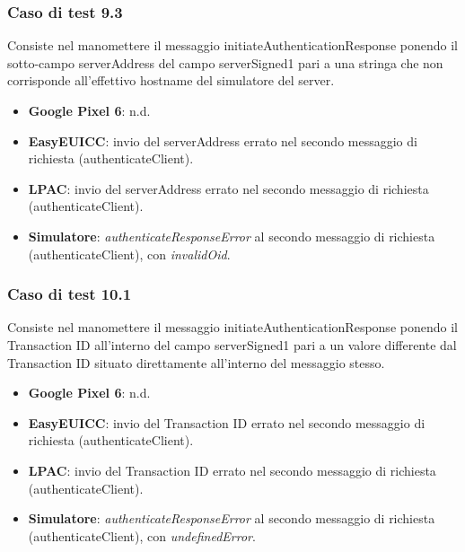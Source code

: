 \documentclass[10pt, oneside]{book}
\begin{document}
\subsubsection{Caso di test 9.3}
Consiste nel manomettere il messaggio initiateAuthenticationResponse ponendo il sotto-campo serverAddress del campo serverSigned1 pari a una stringa che non corrisponde all’effettivo hostname del simulatore del server.
\begin{itemize}
\item \textbf{Google Pixel 6}: n.d.
\item \textbf{EasyEUICC}: invio del serverAddress errato nel secondo messaggio di richiesta (authenticateClient).
\item \textbf{LPAC}: invio del serverAddress errato nel secondo messaggio di richiesta (authenticateClient).
\item \textbf{Simulatore}: \textit{authenticateResponseError} al secondo messaggio di richiesta (authenticateClient), con \textit{invalidOid}.
\end{itemize}

\subsubsection{Caso di test 10.1}
Consiste nel manomettere il messaggio initiateAuthenticationResponse ponendo il Transaction ID all'interno del campo serverSigned1 pari a un valore differente dal Transaction ID situato direttamente all'interno del messaggio stesso.
\begin{itemize}
\item \textbf{Google Pixel 6}: n.d.
\item \textbf{EasyEUICC}: invio del Transaction ID errato nel secondo messaggio di richiesta (authenticateClient).
\item \textbf{LPAC}: invio del Transaction ID errato nel secondo messaggio di richiesta (authenticateClient).
\item \textbf{Simulatore}: \textit{authenticateResponseError} al secondo messaggio di richiesta (authenticateClient), con \textit{undefinedError}.
\end{itemize}
\end{document}
